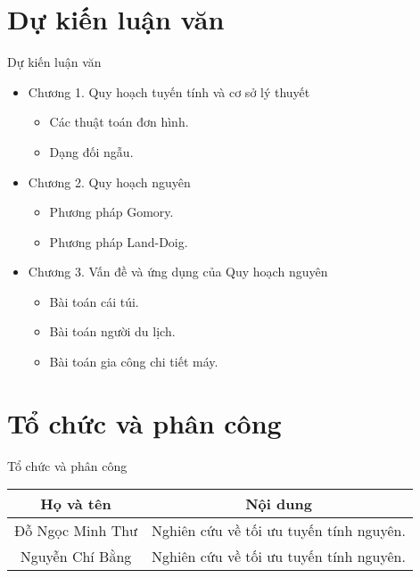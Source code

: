 \documentclass{beamer}
\begin{document}
\section{Dự kiến luận văn}
\begin{frame}{Dự kiến luận văn}
    \begin{itemize}
    \item Chương 1. Quy hoạch tuyến tính và cơ sở lý thuyết
    \begin{itemize}
        \item Các thuật toán đơn hình.
        \item Dạng đối ngẫu.
    \end{itemize}
    \item Chương 2. Quy hoạch nguyên
    \begin{itemize}
        \item Phương pháp Gomory.
        \item Phương pháp Land-Doig.
    \end{itemize}
    \item Chương 3. Vấn đề và ứng dụng của Quy hoạch nguyên
    \begin{itemize}
        \item Bài toán cái túi.
        \item Bài toán người du lịch.
        \item Bài toán gia công chi tiết máy. 
    \end{itemize}
    \end{itemize}   
\end{frame}
\section{Tổ chức và phân công}
\begin{frame}{Tổ chức và phân công}
    \begin{table}
        \begin{tabular}{|c|c|}
            \hline
            Họ và tên & Nội dung \\
            \hline \hline
            Đỗ Ngọc Minh Thư & Nghiên cứu về tối ưu tuyến tính nguyên. \\
            Nguyễn Chí Bằng & Nghiên cứu về tối ưu tuyến tính nguyên. \\
            \hline
        \end{tabular}
    \end{table}
\end{frame}
\end{document}

